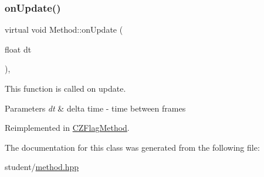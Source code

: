 \mbox{\label{classMethod_a42dbfcfce68e920f7e957f737e93e698}} 
\subsubsection{\texorpdfstring{on\+Update()}{onUpdate()}}
{\footnotesize\ttfamily virtual void Method\+::on\+Update (\begin{DoxyParamCaption}\item[{float}]{dt }\end{DoxyParamCaption})\hspace{0.3cm}{\ttfamily [inline]}, {\ttfamily [virtual]}}



This function is called on update. 


\begin{DoxyParams}{Parameters}
{\em dt} & delta time -\/ time between frames \\
\hline
\end{DoxyParams}


Reimplemented in \hyperlink{classCZFlagMethod_a337cf1158aca2ecf975fee2631071411}{C\+Z\+Flag\+Method}.



The documentation for this class was generated from the following file\+:\begin{DoxyCompactItemize}
\item 
student/\hyperlink{method_8hpp}{method.\+hpp}\end{DoxyCompactItemize}
